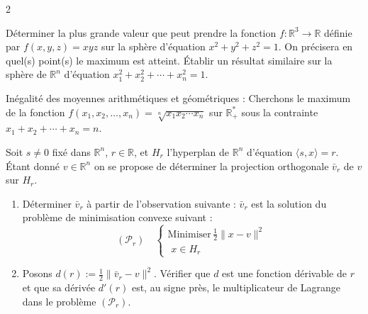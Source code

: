 \begin{multicols}{2}
\begin{exo}
	Déterminer la plus grande valeur que peut prendre la fonction $f : \mathbb{R}^{3} \rightarrow \mathbb{R}$ définie par $f(x, y, z) = xyz$ sur la sphère d'équation $x^{2} + y^{2} + z^{2} = 1$. On précisera en quel(s) point(s) le maximum est atteint. Établir un résultat similaire sur la sphère de $\mathbb{R}^{n}$ d'équation $x_{1}^{2} + x_{2}^{2} + \cdots + x_{n}^{2} = 1$.
\end{exo}

\begin{exo}
	Inégalité des moyennes arithmétiques et géométriques : Cherchons le maximum de la fonction $f(x_{1}, x_{2}, \ldots, x_{n}) = \sqrt[n]{x_{1} x_{2} \cdots x_{n}}$ sur $\mathbb{R}_{+}^{*}$ sous la contrainte $x_{1} + x_{2} + \cdots + x_{n} = n$.
\end{exo}

\begin{exo}
	Soit $s \neq 0$ fixé dans $\mathbb{R}^{n}$, $r \in \mathbb{R}$, et $H_{r}$ l'hyperplan de $\mathbb{R}^{n}$ d'équation $\langle s, x \rangle = r$. Étant donné $v \in \mathbb{R}^{n}$ on se propose de déterminer la projection orthogonale $\bar{v}_{r}$ de $v$ sur $H_{r}$.
	\begin{enumerate}[label=\arabic*.]
		\item Déterminer $\bar{v}_{r}$ à partir de l'observation suivante : $\bar{v}_{r}$ est la solution du problème de minimisation convexe suivant :
		\[
		(\mathcal{P}_{r}) \quad
		\begin{cases}
		\text{Minimiser} \, \frac{1}{2} \|x - v\|^{2} \\
		\,\, x \in H_{r}
		\end{cases}
		\]
		\item Posons $d(r) := \frac{1}{2} \|\bar{v}_{r} - v\|^{2}$. Vérifier que $d$ est une fonction dérivable de $r$ et que sa dérivée $d'(r)$ est, au signe près, le multiplicateur de Lagrange dans le problème $(\mathcal{P}_{r})$.
	\end{enumerate}
\end{exo}


\end{multicols}
